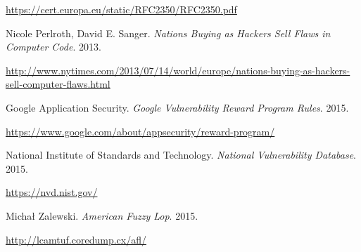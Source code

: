 \documentclass[a4paper,12pt]{article}
\newcommand{\refspace}{\vspace{-2mm}}
\begin{document}
\begin{thebibliography}{}
		\refspace
		\url{https://cert.europa.eu/static/RFC2350/RFC2350.pdf}
		
		Nicole Perlroth, David E. Sanger. \textit{Nations Buying as Hackers Sell Flaws in Computer Code}. 2013.
		
		\refspace
		\url{http://www.nytimes.com/2013/07/14/world/europe/nations-buying-as-hackers-sell-computer-flaws.html}
		
		Google Application Security. \textit{Google Vulnerability Reward Program Rules}. 2015.
		
		\refspace
		\url{https://www.google.com/about/appsecurity/reward-program/}
		
		National Institute of Standards and Technology. \textit{National Vulnerability Database}. 2015.
		
		\refspace
		\url{https://nvd.nist.gov/}
		
		Michał Zalewski. \textit{American Fuzzy Lop}. 2015.
		
		\refspace
		\url{http://lcamtuf.coredump.cx/afl/}
		
	\end{thebibliography}
	\endgroup
\end{document}
